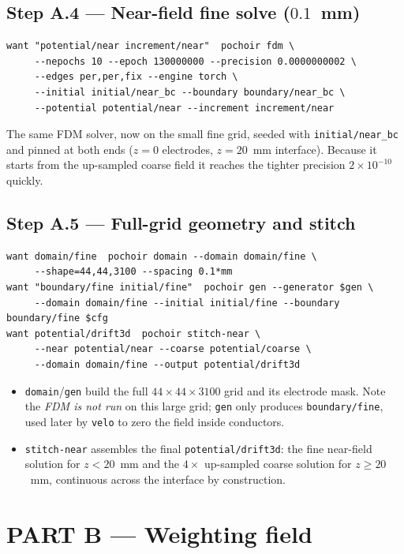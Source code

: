 \documentclass[11pt]{article}
\newcommand{\key}[1]{\texttt{#1}}
\newcommand{\cmd}[1]{\texttt{#1}}
\begin{document}
\subsection*{Step A.4 --- Near-field fine solve ($0.1$~mm)}
\begin{lstlisting}
want "potential/near increment/near"  pochoir fdm \
     --nepochs 10 --epoch 130000000 --precision 0.0000000002 \
     --edges per,per,fix --engine torch \
     --initial initial/near_bc --boundary boundary/near_bc \
     --potential potential/near --increment increment/near
\end{lstlisting}
The same FDM solver, now on the small fine grid, seeded with
\key{initial/near\_bc} and pinned at both ends ($z=0$ electrodes, $z=20$~mm
interface).  Because it starts from the up-sampled coarse field it reaches
the tighter precision $2\times10^{-10}$ quickly.

\subsection*{Step A.5 --- Full-grid geometry and stitch}
\begin{lstlisting}
want domain/fine  pochoir domain --domain domain/fine \
     --shape=44,44,3100 --spacing 0.1*mm
want "boundary/fine initial/fine"  pochoir gen --generator $gen \
     --domain domain/fine --initial initial/fine --boundary boundary/fine $cfg
want potential/drift3d  pochoir stitch-near \
     --near potential/near --coarse potential/coarse \
     --domain domain/fine --output potential/drift3d
\end{lstlisting}
\begin{itemize}
  \item \cmd{domain}/\cmd{gen} build the full $44\times44\times3100$ grid
        and its electrode mask.  Note the \emph{FDM is not run} on this
        large grid; \cmd{gen} only produces \key{boundary/fine}, used later
        by \cmd{velo} to zero the field inside conductors.
  \item \cmd{stitch-near} assembles the final
        \key{potential/drift3d}: the fine near-field solution for
        $z<20$~mm and the $4\times$ up-sampled coarse solution for
        $z\ge20$~mm, continuous across the interface by construction.
\end{itemize}

\section{PART B --- Weighting field}
\end{document}
